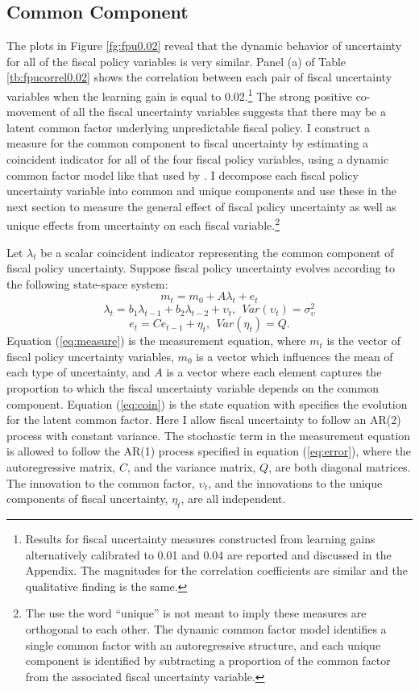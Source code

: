 \documentclass[11pt]{article}
\newcommand{\beq}{\begin{equation}}
\newcommand{\eeq}{\end{equation}}
\newcommand{\citee}[1]{\citet{#1}}
\begin{document}
\subsection{Common Component}\label{s:common}

The plots in Figure \ref{fg:fpu0.02} reveal that the dynamic behavior of uncertainty for all of the fiscal policy variables is very similar.  Panel (a) of Table \ref{tb:fpucorrel0.02} shows the correlation between each pair of fiscal uncertainty variables when the learning gain is equal to 0.02.\footnote{Results for fiscal uncertainty measures constructed from learning gains alternatively calibrated to 0.01 and 0.04 are reported and discussed in the Appendix.  The magnitudes for the correlation coefficients are similar and the qualitative finding is the same.}  The strong positive co-movement of all the fiscal uncertainty variables suggests that there may be a latent common factor underlying unpredictable fiscal policy.  I construct a measure for the common component to fiscal uncertainty by estimating a coincident indicator for all of the four fiscal policy variables, using a dynamic common factor model like that used by \citee{StockWatson1989}.  I decompose each fiscal policy uncertainty variable into common and unique components and use these in the next section to measure the general effect of fiscal policy uncertainty as well as unique effects from uncertainty on each fiscal variable.\footnote{The use the word ``unique'' is not meant to imply these measures are orthogonal to each other.  The dynamic common factor model identifies a single common factor with an autoregressive structure, and each unique component is identified by subtracting a proportion of the common factor from the associated fiscal uncertainty variable.}  

Let $\lambda_t$ be a scalar coincident indicator representing the common component of fiscal policy uncertainty.  Suppose fiscal policy uncertainty evolves according to the following state-space system:
\beq \label{eq:measure} m_t = m_0 + A \lambda_t + e_t \eeq
\beq \label{eq:coin} \lambda_t = b_1 \lambda_{t-1} + b_2 \lambda_{t-2} + \upsilon_t,~~ Var(\upsilon_t) = \sigma_\upsilon^2 \eeq
\beq \label{eq:error} e_t = C e_{t-1} + \eta_t,~~ Var(\eta_t) = Q. \eeq
Equation (\ref{eq:measure}) is the measurement equation, where $m_t$ is the vector of fiscal policy uncertainty variables, $m_0$ is a vector which influences the mean of each type of uncertainty, and $A$ is a vector where each element captures the proportion to which the fiscal uncertainty variable depends on the common component.  Equation (\ref{eq:coin}) is the state equation with specifies the evolution for the latent common factor.  Here I allow fiscal uncertainty to follow an AR(2) process with constant variance.  The stochastic term in the measurement equation is allowed to follow the AR(1) process specified in equation (\ref{eq:error}), where the autoregressive matrix, $C$, and the variance matrix, $Q$, are both diagonal matrices.  The innovation to the common factor, $\upsilon_t$, and the innovations to the unique components of fiscal uncertainty, $\eta_t$, are all independent.
\end{document}
